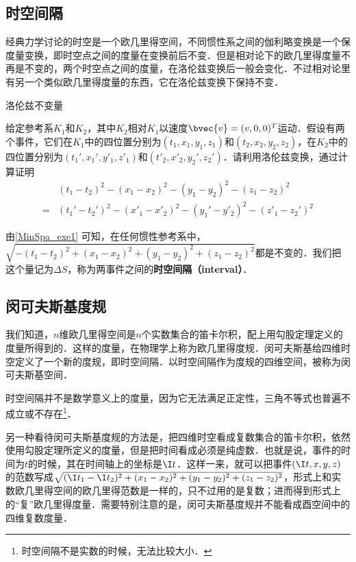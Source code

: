 

\subsection{时空间隔}
经典力学讨论的时空是一个欧几里得空间，不同惯性系之间的伽利略变换是一个保度量变换，即时空点之间的度量在变换前后不变．但是相对论下的欧几里得度量不再是不变的，两个时空点之间的度量，在洛伦兹变换后一般会变化．不过相对论里有另一个类似欧几里得度量的东西，它在洛伦兹变换下保持不变．

\begin{exercise}{洛伦兹不变量}\label{MinSpa_exe1}

给定参考系$K_1$和$K_2$，其中$K_2$相对$K_1$以速度$\bvec{v}=(v,0,0)^T$运动．假设有两个事件，它们在$K_1$中的四位置分别为$(t_1, x_1, y_1, z_1)$和$(t_2, x_2, y_2, z_2)$，在$K_2$中的四位置分别为$(t_1', x_1', y'_1, z'_1)$和$(t'_2, x'_2, y_2', z_2')$．请利用洛伦兹变换，通过计算证明
\begin{equation}
\begin{aligned}
&(t_1-t_2)^2-(x_1-x_2)^2-(y_1-y_2)^2-(z_1-z_2)^2\\=&(t_1'-t_2')^2-(x'_1-x'_2)^2-(y_1'-y'_2)^2-(z'_1-z_2')^2
\end{aligned}
\end{equation}
\end{exercise}

由\autoref{MinSpa_exe1} 可知，在任何惯性参考系中，$\sqrt{-(t_1-t_2)^2+(x_1-x_2)^2+(y_1-y_2)^2+(z_1-z_2)^2}$都是不变的．我们把这个量记为$\Delta S$，称为两事件之间的\textbf{时空间隔（interval）}．

\subsection{闵可夫斯基度规}

我们知道，$n$维欧几里得空间是$n$个实数集合的笛卡尔积，配上用勾股定理定义的度量所得到的．这样的度量，在物理学上称为欧几里得度规．闵可夫斯基给四维时空定义了一个新的度规，即时空间隔．以时空间隔作为度规的四维空间，被称为闵可夫斯基空间．

时空间隔并不是数学意义上的度量，因为它无法满足正定性，三角不等式也普遍不成立或不存在\footnote{时空间隔不是实数的时候，无法比较大小．}．

另一种看待闵可夫斯基度规的方法是，把四维时空看成复数集合的笛卡尔积，依然使用勾股定理所定义的度量，但是把时间看成必须是纯虚数．也就是说，事件的时间为$t$的时候，其在时间轴上的坐标是$\I t$．这样一来，就可以把事件$(\I t, x, y, z)$的范数写成$\sqrt{(\I t_1-\I t_2)^2+(x_1-x_2)^2+(y_1-y_2)^2+(z_1-z_2)^2}$，形式上和实数欧几里得空间的欧几里得范数是一样的，只不过用的是复数；进而得到形式上的“复”欧几里得度量．需要特别注意的是，闵可夫斯基度规并不能看成酉空间中的四维复数度量．

